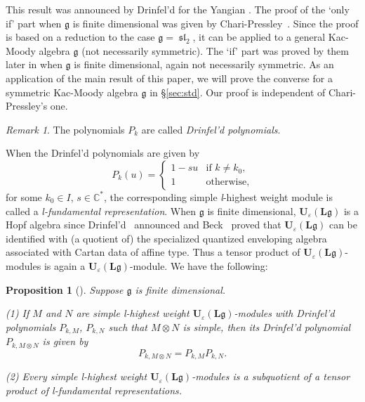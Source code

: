 \documentclass[12pt]{amsart}
\def\Bbb{\mathbb}
\def\frak{\mathfrak}
\newcommand{\rom}{\textup}
\newtheorem{Proposition}[equation]{Proposition}
\theoremstyle{definition}
\theoremstyle{remark}
\newtheorem{Remark}[equation]{Remark}
\numberwithin{equation}{subsection}
\newcommand{\secref}[1]{\S\ref{#1}}
\newcommand{\C}{{\Bbb C}}
\newcommand{\algsl}{\operatorname{\frak{sl}}} %
\newcommand{\Ule}{{\mathbf U}_{\varepsilon}({\mathbf L}\mathfrak g)}
\begin{document}
This result was announced by Drinfel'd for the Yangian \cite{Drinfeld}.
The proof of the `only if' part when $\mathfrak g$ is finite
dimensional was given by Chari-Pressley~\cite[12.2.6]{CP}. Since the
proof is based on a reduction to the case $\mathfrak g = \algsl_2$, it 
can be applied to a general Kac-Moody algebra $\mathfrak g$
(not necessarily symmetric).
%
The `if' part was proved by them later in \cite{CP2} when $\mathfrak
g$ is finite dimensional, again not necessarily symmetric.
%
As an application of the main result of this paper, we will prove the
converse for a symmetric Kac-Moody algebra $\mathfrak g$ in
\secref{sec:std}. Our proof is independent of Chari-Pressley's one.

\begin{Remark}
The polynomials $P_k$ are called {\it Drinfel'd polynomials}.
\end{Remark}

When the Drinfel'd polynomials are given by
\begin{equation*}
   P_k(u) = 
   \begin{cases}
     1 - su  & \text{if $k\neq k_0$,} \\
     1 & \text{otherwise},
   \end{cases}
\end{equation*}
for some $k_0\in I$, $s\in\C^*$, the corresponding simple {\it
l\/}-highest weight module is called a {\it l-fundamental representation}.
%
When $\mathfrak g$ is finite dimensional, $\Ule$ is a Hopf algebra
since Drinfel'd~\cite{Drinfeld} announced and Beck~\cite{Beck} proved
that $\Ule$ can be identified with (a quotient of) the specialized
quantized enveloping algebra associated with Cartan data of affine
type. Thus a tensor product of $\Ule$-modules is again a
$\Ule$-module. We have the following:

\begin{Proposition}[]\label{prop:tensor}
Suppose $\mathfrak g$ is finite dimensional.

\rom{(1)} If $M$ and $N$ are simple {\it l\/}-highest weight
$\Ule$-modules with Drinfel'd polynomials $P_{k,M}$, $P_{k,N}$ such
that $M\otimes N$ is simple, then its Drinfel'd polynomial
$P_{k,M\otimes N}$ is given by
\begin{equation*}
   P_{k,M\otimes N} = P_{k,M} P_{k,N}.
\end{equation*}

\rom{(2)} Every simple {\it l\/}-highest weight $\Ule$-modules is a
subquotient of a tensor product of {\it l\/}-fundamental
representations.
\end{Proposition}
\end{document}

